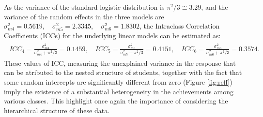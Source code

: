 As the variance of the standard logistic distribution is \(\pi^2 / 3 \cong 3.29\), and the variance of the random effects in the three models are \(\sigma^2_{m4} = 0.5619,\quad \sigma^2_{m5} = 2.3345,\quad \sigma^2_{m6} = 1.8302\), the Intraclass Correlation Coefficients (ICCs) for the underlying linear
models can be estimated as:
\begin{gather*}
    \begin{aligned}
        ICC_4 = \frac{\sigma^2_{m4}}{\sigma^2_{m4}+\pi^2 / 3}= 0.1459, \quad ICC_5 = \frac{\sigma^2_{m5}}{\sigma^2_{m5}+\pi^2 / 3}= 0.4151, \quad ICC_6 = \frac{\sigma^2_{m6}}{\sigma^2_{m6}+\pi^2 / 3}= 0.3574.
    \end{aligned}
\end{gather*}
These values of ICC, measuring the unexplained variance in the response that can be atributed to the nested structure of students, together with the fact that some random intercepts are significantly different from zero (Figure \ref{fig:reff})
imply the existence of a substantial heterogeneity in the achievements among various classes. This highlight once again the importance of considering the hierarchical structure of these data.

